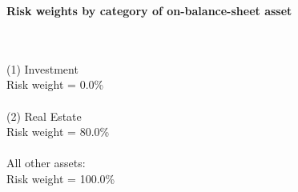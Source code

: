 \documentclass{article}
\begin{document}
\setlength{\parindent}{0em}
\begin{center}{\bf Risk weights by category of on-balance-sheet asset}\end{center}
~\\
~\\

(1) Investment\\
Risk weight = 0.0\%\\

~\\
(2) Real Estate\\
Risk weight = 80.0\%\\

~\\
All other assets:\\
Risk weight = 100.0\%\\

~\\
\end{document}
